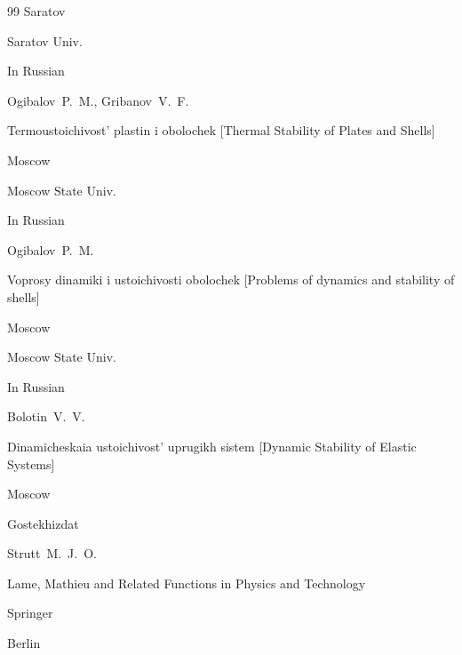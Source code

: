 \begin{thebibliography}{99}
\publaddr Saratov

\publ Saratov Univ.








\lang In Russian

\by Ogibalov~P.~M., Gribanov~V.~F.

\book Termoustoichivost' plastin i obolochek \rm [Thermal Stability of Plates and Shells]

\publaddr Moscow

\publ Moscow State Univ.








\lang In Russian

\by Ogibalov~P.~M.

\book Voprosy dinamiki i ustoichivosti obolochek \rm [Problems of dynamics and stability of shells]

\publaddr Moscow

\publ Moscow State Univ.








\lang In Russian

\by Bolotin~V.~V.

\book Dinamicheskaia ustoichivost' uprugikh sistem \rm [Dynamic Stability of Elastic Systems]

\publaddr Moscow

\publ Gostekhizdat








\by Strutt~M.~J.~O. 

\book Lame, Mathieu and Related Functions in Physics and Technology 

\publ Springer

\publaddr Berlin


\end{thebibliography}
